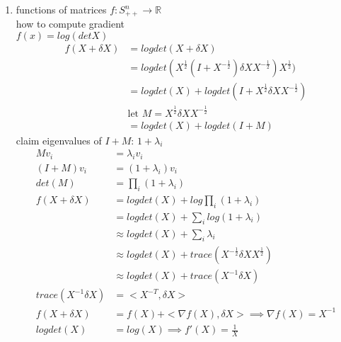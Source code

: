 \documentclass[12pt,letter]{article}
\newcommand{\R}{\mathbb{R}}
\begin{document}
\begin{enumerate}
  \pagebreak
  
\item functions of matrices $f:S_{++}^n \to \R$\\
  how to compute gradient\\
  $f(x)=log(det X)$\\
  \begin{align*}
    f(X+\delta X) &= logdet(X+\delta X)\\
                  &= logdet(X^{\frac{1}{2}}(I+X^{-\frac{1}{2}}) \delta X X^{-\frac{1}{2}})X^{\frac{1}{2}})\\
                  &= logdet(X)+logdet(I+X^{\frac{1}{2}} \delta X X^{-\frac{1}{2}})\\
                  & \text{let } M = X^{\frac{1}{2}} \delta X X^{-\frac{1}{2}}\\
                  &= logdet(X)+logdet(I+M)
  \end{align*}
  claim eigenvalues of $I+M$: $1+\lambda_i$
  \begin{align*}
    Mv_i &= \lambda_i v_i\\
    (I+M)v_i &= (1+\lambda_i)v_i\\
    det(M)&=\prod_i(1+\lambda_i)\\
    f(X+\delta X) &= logdet(X) + log \prod_i(1+\lambda_i)\\
         &= logdet(X) + \sum_i log(1+\lambda_i)\\
         &\approx logdet(X) + \sum_i \lambda_i\\
         &\approx logdet(X) + trace(X^{-\frac{1}{2}} \delta X X^{\frac{1}{2}})\\
         &\approx logdet(X) + trace(X^{-1} \delta X)\\
    trace(X^{-1} \delta X) &= <X^{-T},\delta X>\\
    f(X+\delta X) &= f(X) + <\nabla f(X), \delta X> \implies \nabla f(X) = X^{-1}\\
    logdet(X) &= log(X) \implies f'(X)=\frac{1}{X}
  \end{align*}

  \pagebreak
  

\end{enumerate}
\end{document}
